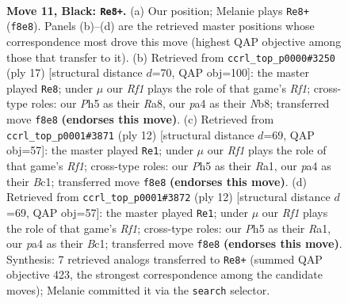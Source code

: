 \documentclass[11pt]{article}
\begin{document}
\clearpage

\begin{figure}[p]\centering
\begin{subfigure}{0.46\textwidth}\centering
\resizebox{\linewidth}{!}{%
\newchessgame
\chessboard[
  setfen={rnbq1rk1/p4pp1/1p3n2/3p3p/Pb1P3P/2NB1NP1/1P3P2/R1BQK2R b KQ - 0 11},
  showmover=false,
  pgfstyle=straightmove, color=movearrow, markmove={f8-e8}
]}
\caption{}
\end{subfigure}\hfill
\begin{subfigure}{0.46\textwidth}\centering
\resizebox{\linewidth}{!}{%
\newchessgame
\chessboard[
  setfen={rnbq1rk1/pp3pbp/3p1np1/2pP2B1/4P3/2N2N1P/PP3PP1/R2QKB1R b KQ - 0 9},
  showmover=false,
  pgfstyle=straightmove, color=movearrow, markmove={f8-e8}
]}
\caption{}
\end{subfigure}
\\[4pt]
\begin{subfigure}{0.46\textwidth}\centering
\resizebox{\linewidth}{!}{%
\newchessgame
\chessboard[
  setfen={r1bqk2r/ppp2ppp/2np1n2/1B2p3/4P3/2P2N2/PPP2PPP/R1BQ1RK1 w kq - 0 7},
  showmover=false,
  pgfstyle=straightmove, color=movearrow, markmove={f1-e1}
]}
\caption{}
\end{subfigure}\hfill
\begin{subfigure}{0.46\textwidth}\centering
\resizebox{\linewidth}{!}{%
\newchessgame
\chessboard[
  setfen={r1bqk2r/ppp2ppp/2np1n2/1B2p3/4P3/2P2N2/PPP2PPP/R1BQ1RK1 w kq - 0 7},
  showmover=false,
  pgfstyle=straightmove, color=movearrow, markmove={f1-e1}
]}
\caption{}
\end{subfigure}
\caption{\textbf{Move 11, Black: \texttt{Re8+}.} (a) Our position; Melanie plays \texttt{Re8+} (\texttt{f8e8}). Panels (b)--(d) are the retrieved master positions whose correspondence most drove this move (highest QAP objective among those that transfer to it). (b) Retrieved from \texttt{ccrl\_top\_p0000\#3250} (ply 17) [structural distance $d$=70, QAP obj=100]: the master played \texttt{Re8}; under $\mu$ our \emph{Rf1} plays the role of that game's \emph{Rf1}; cross-type roles: our \emph{P}h5 as their \emph{R}a8, our \emph{p}a4 as their \emph{N}b8; transferred move \texttt{f8e8} \textbf{(endorses this move)}. (c) Retrieved from \texttt{ccrl\_top\_p0001\#3871} (ply 12) [structural distance $d$=69, QAP obj=57]: the master played \texttt{Re1}; under $\mu$ our \emph{Rf1} plays the role of that game's \emph{Rf1}; cross-type roles: our \emph{P}h5 as their \emph{R}a1, our \emph{p}a4 as their \emph{B}c1; transferred move \texttt{f8e8} \textbf{(endorses this move)}. (d) Retrieved from \texttt{ccrl\_top\_p0001\#3872} (ply 12) [structural distance $d$=69, QAP obj=57]: the master played \texttt{Re1}; under $\mu$ our \emph{Rf1} plays the role of that game's \emph{Rf1}; cross-type roles: our \emph{P}h5 as their \emph{R}a1, our \emph{p}a4 as their \emph{B}c1; transferred move \texttt{f8e8} \textbf{(endorses this move)}. Synthesis: 7 retrieved analogs transferred to \texttt{Re8+} (summed QAP objective 423, the strongest correspondence among the candidate moves); Melanie committed it via the \texttt{search} selector.}
\label{fig:thought-m21}
\end{figure}
\end{document}

